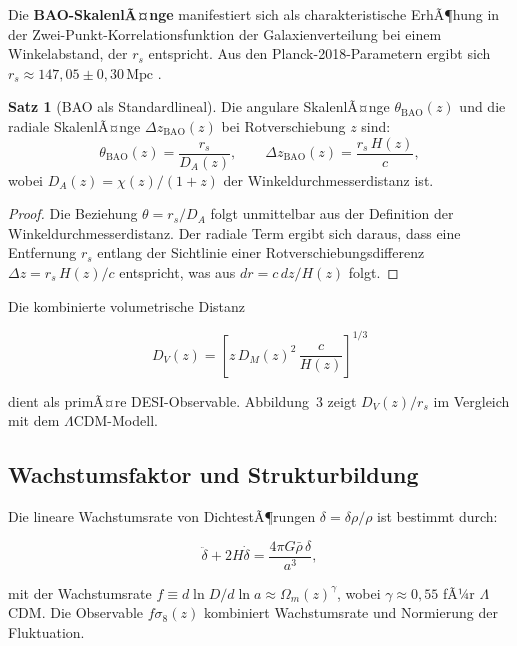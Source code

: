 ﻿\documentclass[a4paper,12pt]{article}
\theoremstyle{definition}
\newtheorem{satz}{Satz}[section]
\theoremstyle{remark}
\begin{document}
Die \textbf{BAO-SkalenlÃ¤nge} manifestiert sich als charakteristische ErhÃ¶hung
in der Zwei-Punkt-Korrelationsfunktion der Galaxienverteilung bei einem
Winkelabstand, der $r_s$ entspricht. Aus den Planck-2018-Parametern ergibt sich
$r_s \approx 147{,}05 \pm 0{,}30\,\text{Mpc}$ \cite{planck2018}.

\begin{satz}[BAO als Standardlineal]
  Die angulare SkalenlÃ¤nge $\theta_\mathrm{BAO}(z)$ und die radiale
  SkalenlÃ¤nge $\Delta z_\mathrm{BAO}(z)$ bei Rotverschiebung $z$ sind:
  \begin{equation}
    \label{eq:bao_angular}
    \theta_\mathrm{BAO}(z) = \frac{r_s}{D_A(z)}, \qquad
    \Delta z_\mathrm{BAO}(z) = \frac{r_s\,H(z)}{c},
  \end{equation}
  wobei $D_A(z) = \chi(z)/(1+z)$ der Winkeldurchmesserdistanz ist.
\end{satz}

\begin{proof}
  Die Beziehung $\theta = r_s/D_A$ folgt unmittelbar aus der Definition der
  Winkeldurchmesserdistanz. Der radiale Term ergibt sich daraus, dass eine
  Entfernung $r_s$ entlang der Sichtlinie einer Rotverschiebungsdifferenz
  $\Delta z = r_s\,H(z)/c$ entspricht, was aus $dr = c\,dz/H(z)$ folgt.
\end{proof}

Die kombinierte volumetrische Distanz

\begin{equation}
  \label{eq:DV}
  D_V(z) = \left[z\,D_M(z)^2\,\frac{c}{H(z)}\right]^{1/3}
\end{equation}

dient als primÃ¤re DESI-Observable. Abbildung~3 zeigt $D_V(z)/r_s$ im Vergleich
mit dem $\Lambda$CDM-Modell.

\subsection{Wachstumsfaktor und Strukturbildung}

Die lineare Wachstumsrate von DichtestÃ¶rungen $\delta = \delta\rho/\rho$ ist
bestimmt durch:

\begin{equation}
  \label{eq:growth}
  \ddot{\delta} + 2H\dot{\delta} = \frac{4\pi G\bar\rho\,\delta}{a^3},
\end{equation}

mit der Wachstumsrate $f \equiv d\ln D/d\ln a \approx \Omega_m(z)^\gamma$,
wobei $\gamma \approx 0{,}55$ fÃ¼r $\Lambda$CDM. Die Observable $f\sigma_8(z)$
kombiniert Wachstumsrate und Normierung der Fluktuation.
\end{document}
